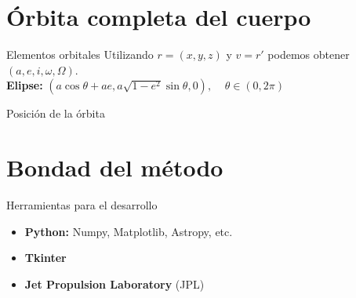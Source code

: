 \documentclass{beamer}
\begin{document}
\section{Órbita completa del cuerpo}
\begin{frame}{Elementos orbitales}
Utilizando $r=(x,y,z)$ y $v=r'$ podemos obtener $(a,e,i,\omega,\Omega)$.\\
\pause
\vspace{1cm}
\textbf{Elipse:}
\hspace{0.75cm}
$
(a\cos{\theta}+ae, a\sqrt{1-e^2}\sin{\theta}, 0), \; \; \; \; \theta\in(0,2\pi)
$
\end{frame}


\begin{frame}{Posición de la órbita}

\end{frame}

\section{Bondad del método}

\begin{frame}{Herramientas para el desarrollo}
\begin{itemize}
\item \textbf{Python:} Numpy, Matplotlib, Astropy, etc.
\item \textbf{Tkinter}
\item \textbf{Jet Propulsion Laboratory} (JPL)
\end{itemize}
\end{frame}
\end{document}
